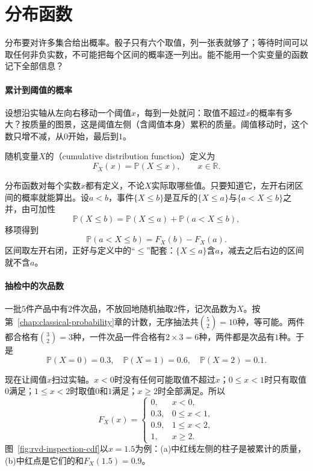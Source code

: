 \section{分布函数}
\label{sec:rvd-distribution-functions}

分布要对许多集合给出概率。骰子只有六个取值，列一张表就够了；等待时间可以取任何非负实数，不可能把每个区间的概率逐一列出。能不能用一个实变量的函数记下全部信息？

\paragraph{累计到阈值的概率}
设想沿实轴从左向右移动一个阈值$x$，每到一处就问：取值不超过$x$的概率有多大？按质量的图景，这是阈值左侧（含阈值本身）累积的质量。阈值移动时，这个数只增不减，从$0$开始，最后到$1$。

\begin{definition}[分布函数]
\label{def:rvd-cdf}
随机变量$X$的（cumulative distribution function）定义为
\begin{equation}
  F_X(x)=\mathbb{P}(X\leq x),\qquad x\in\mathbb{R}.
  \label{eq:rvd-cdf}
\end{equation}
\end{definition}

分布函数对每个实数$x$都有定义，不论$X$实际取哪些值。只要知道它，左开右闭区间的概率就能算出。设$a<b$，事件$\{X\leq b\}$是互斥的$\{X\leq a\}$与$\{a<X\leq b\}$之并，由可加性
\[
  \mathbb{P}(X\leq b)=\mathbb{P}(X\leq a)+\mathbb{P}(a<X\leq b),
\]
移项得到
\begin{equation}
  \mathbb{P}(a<X\leq b)=F_X(b)-F_X(a).
  \label{eq:rvd-interval}
\end{equation}
区间取左开右闭，正好与定义中的“$\leq$”配套：$\{X\leq a\}$含$a$，减去之后右边的区间就不含$a$。

\paragraph{抽检中的次品数}
一批$5$件产品中有$2$件次品，不放回地随机抽取$2$件，记次品数为$X$。按第~\ref{chap:classical-probability}章的计数，无序抽法共$\binom52=10$种，等可能。两件都合格有$\binom32=3$种，一件次品一件合格有$2\times3=6$种，两件都是次品有$1$种。于是
\[
  \mathbb{P}(X=0)=0.3,\quad \mathbb{P}(X=1)=0.6,\quad \mathbb{P}(X=2)=0.1 .
\]

现在让阈值$x$扫过实轴。$x<0$时没有任何可能取值不超过$x$；$0\leq x<1$时只有取值$0$满足；$1\leq x<2$时取值$0$和$1$满足；$x\geq2$时全部满足。所以
\begin{equation}
  F_X(x)=\begin{cases}
    0,&x<0,\\
    0.3,&0\leq x<1,\\
    0.9,&1\leq x<2,\\
    1,&x\geq 2.
  \end{cases}
  \label{eq:rvd-inspection-cdf}
\end{equation}
图~\ref{fig:rvd-inspection-cdf}以$x=1.5$为例：(a)中红线左侧的柱子是被累计的质量，(b)中红点是它们的和$F_X(1.5)=0.9$。

